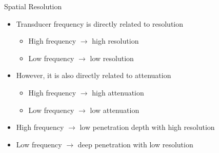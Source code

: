 \begin{frame}{Spatial Resolution \cont}

    \begin{itemize}
        \item Transducer frequency is directly related to resolution
              \begin{itemize}
                  \item High frequency $\rightarrow$ high resolution
                  \item Low frequency $\rightarrow$ low resolution
              \end{itemize}
              \vspace{.3cm}
        \item However, it is also directly related to attenuation
              \begin{itemize}
                  \item High frequency $\rightarrow$ high attenuation
                  \item Low frequency $\rightarrow$ low attenuation
              \end{itemize}
              \vspace{.3cm}
        \item High frequency $\rightarrow$ low penetration depth with high resolution
              \vspace{.3cm}
        \item Low frequency $\rightarrow$ deep penetration with low resolution
    \end{itemize}

\end{frame}


